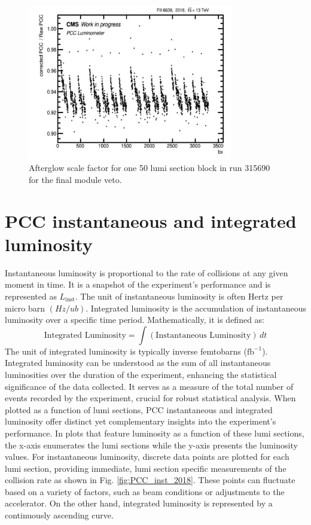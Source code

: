 \begin{figure}[H]
\centering
\includegraphics[width=0.8\textwidth]{ashish_thesis/afterglow_correction_factor_1lsblock_315690_3.png}
\caption[Run 315690 afterglow scale factor]{%
  Afterglow scale factor for one 50 lumi section block in run 315690 for the final module veto.
}
\label{fig:af_change_veto}
\end{figure}


\section{PCC instantaneous and integrated luminosity}

Instantaneous luminosity is proportional to the rate of collisions at any given moment in time. It is a snapshot of the experiment's performance and is represented as \( L_{\text{inst}} \). The unit of instantaneous luminosity is often Hertz per micro barn $(Hz/ub)$. Integrated luminosity is the accumulation of instantaneous luminosity over a specific time period. Mathematically, it is defined as:
\[
\text{Integrated Luminosity} = \int (\text{Instantaneous Luminosity}) \, dt
\]
The unit of integrated luminosity is typically inverse femtobarns (\( \text{fb}^{-1} \)). Integrated luminosity can be understood as the sum of all instantaneous luminosities over the duration of the experiment, enhancing the statistical significance of the data collected. It serves as a measure of the total number of events recorded by the experiment, crucial for robust statistical analysis. When plotted as a function of lumi sections, PCC instantaneous and integrated luminosity offer distinct yet complementary insights into the experiment's performance. In plots that feature luminosity as a function of these lumi sections, the x-axis enumerates the lumi sections while the y-axis presents the luminosity values.  For instantaneous luminosity, discrete data points are plotted for each lumi section, providing immediate, lumi section specific measurements of the collision rate as shown in Fig. \ref{fig:PCC_inst_2018}. These points can fluctuate based on a variety of factors, such as beam conditions or adjustments to the accelerator. On the other hand, integrated luminosity is represented by a continuously ascending curve. %

